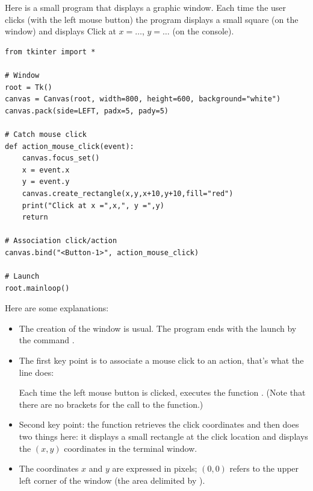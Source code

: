 \documentclass[11pt,class=report,crop=false]{standalone}
\begin{document}
\begin{cours}


Here is a small program that displays a graphic window. Each time the user clicks (with the left mouse button) the program displays a small square (on the window) and displays \og{}Click at $x=\ldots$, $y=\ldots$\fg{} (on the console).

\begin{lstlisting}
from tkinter import *

# Window
root = Tk()
canvas = Canvas(root, width=800, height=600, background="white")
canvas.pack(side=LEFT, padx=5, pady=5)

# Catch mouse click
def action_mouse_click(event):
    canvas.focus_set()
    x = event.x
    y = event.y
    canvas.create_rectangle(x,y,x+10,y+10,fill="red")
    print("Click at x =",x,", y =",y)
    return

# Association click/action
canvas.bind("<Button-1>", action_mouse_click)

# Launch
root.mainloop()
\end{lstlisting}


Here are some explanations:
\begin{itemize}
  \item The creation of the window is usual. The program ends with the launch by the command .
  
  \item The first key point is to associate a mouse click to an action, that's what the line does: 

Each time the left mouse button is clicked, \Python{} executes the function . (Note that there are no brackets for the call to the function.)

   \item Second key point: the  function retrieves the click coordinates and then does two things here: it displays a small rectangle at the click location and displays the $(x,y)$ coordinates in the terminal window.
   
   \item The coordinates $x$ and $y$ are expressed in pixels; $(0,0)$ refers to the upper left corner of the window (the area delimited by ).
\end{itemize}
\end{cours}
\end{document}
